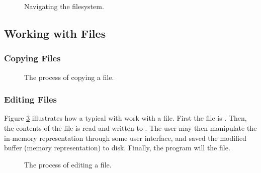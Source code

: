 \begin{figure}[tbp]
  
  \caption{Navigating the filesystem.}
  \label{fig:bg:processes:navigation}
\end{figure}

\subsection{Working with Files}

\subsubsection{Copying Files}



\begin{figure}[tbp]
  
  \caption{The process of copying a file.}
  \label{fig:bg:processes:copy}
\end{figure}

\subsubsection{Editing Files}


Figure \ref{fig:bg:processes:edit} illustrates how a typical  with work with a file. First the file is . Then, the contents of the file is read and written to . The user may then manipulate the in-memory representation through some user interface, and saved the modified buffer (memory representation) to disk. Finally, the program will  the file.

\begin{figure}[tbp]
  
  \caption{The process of editing a file.}
  \label{fig:bg:processes:edit}
\end{figure}

